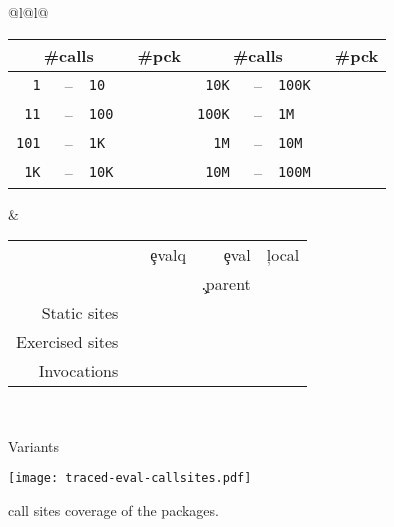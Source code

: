 \documentclass[screen,acmsmall]{acmart}
\begin{document}
\begin{figure}[!b]
\small
\begin{tabular}{@{}l@{\hspace{1.5cm}}l@{}}
\begin{minipage} {5cm}\small
  \begin{tabular}{|r@{\,}r@{\,}l@{}r|r@{\,}r@{\,}l@{}r|} \hline
    \multicolumn{3}{|c}{\small\#calls} &\small \#pck
&     \multicolumn{3}{c}{\small\#calls} &\small\#pck \\\hline
\tt 1 &--& \tt 10      & \packageBina  & \tt 10K &--&\tt 100K  & \packageBine\\
\tt 11 &--& \tt 100    & \packageBinb  & \tt 100K &--&\tt 1M  & \packageBinf\\
\tt 101 &--& \tt 1K    & \packageBinc  & \tt 1M &--&\tt 10M   & \packageBing\\
\tt 1K &--& \tt 10K    & \packageBind  & \tt 10M &--& \tt 100M & \packageBinh\\\hline
\end{tabular}
\caption{Call frequency}\label{freq}
\end{minipage}
&
\begin{minipage}{7cm}\small
\begin{tabular}{|@{\,}r|rrrr|}\hline
  &\eval & \c{evalq} & \c{eval} & \c{local}\\[-1.5mm]
           & & & \c{.parent} &\\\hline
\small Static sites &\packageStaticeval&\packageStaticevalq&\packageStaticevalparent&\packageStaticlocal \\
\small Exercised sites&\packageTriggeredeval&\packageTriggeredevalq&\packageTriggeredevalparent&\packageTriggeredlocal\\
\small Invocations&\packageEvalsRnd&\packageEvalqsRnd&\packageEparentsRnd&\packageLocalsRnd\\\hline
\end{tabular}~\\[2mm]\caption{Variants}\label{tab:variantseval}
\end{minipage}\end{tabular}

\end{figure}

\begin{figure}[b] \centering
  \texttt{[image: traced-eval-callsites.pdf]} \centering
  \caption{\eval call sites coverage of the \PkgPackages packages.}%
  \label{fig:traced-eval-callsites}
\end{figure}
\end{document}
